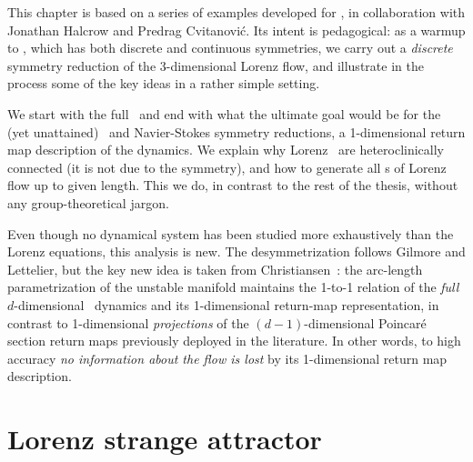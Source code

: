 

This chapter is based on a series of examples developed for
\wwwcb{}, in collaboration with Jonathan Halcrow and
Predrag Cvitanovi\'c. Its intent is pedagogical: as a warmup to
\KSe, which has both discrete and continuous
symmetries, we carry out a {\em discrete} symmetry reduction of
the 3-dimensional Lorenz flow, and illustrate in the process
some of the key ideas in a rather simple setting.

We start with the full \statesp\ and end with what the ultimate
goal would be for the (yet unattained) \KS\ and Navier-Stokes
symmetry reductions, a 1-dimensional return map description of
the dynamics. We explain why Lorenz \eqva\ are heteroclinically
connected (it is not due to the symmetry), and how to generate
all \po s of Lorenz flow up to given length. This we do, in
contrast to the rest of the thesis, without any
group-theoretical jargon.

Even though no dynamical system has been studied more
exhaustively than the Lorenz equations, this analysis is new.
The desymmetrization follows Gilmore and
Lettelier, but the key new idea is taken from
Christiansen~\etal{}: the arc-length
parametrization of the unstable manifold maintains the 1-to-1
relation of the {\em full} $d$-dimensional \statesp\ dynamics
and its 1-dimensional return-map representation, in contrast to
1-dimensional {\em projections} of the $(d\!-\!1)$-dimensional
Poincar\'e section return maps previously deployed in the
literature. In other words, to high accuracy {\em no information
about the flow is lost} by its 1-dimensional return map description.


\section{Lorenz strange attractor}\label{exmp:Lorenz}

